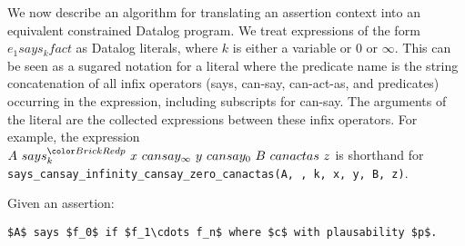 \documentclass[thesis.tex]{subfiles}
\begin{document}
We now describe an algorithm for translating an assertion context into
an equivalent constrained Datalog program. We treat expressions of the
form $e_1 says_k fact$ as Datalog literals, where $k$ is either a
variable or 0 or $\infty$. This can be seen as a sugared notation for
a literal where the predicate name is the string concatenation of all
infix operators (\textsf{says}, \textsf{can-say}, \textsf{can-act-as},
and predicates) occurring in the expression, including subscripts for
\textsf{can-say}. The arguments of the literal are the collected
expressions between these infix operators. For example, the expression
$A~says_k^{\new{p}}~x~can say_\infty~y~can say_0~B~can act as~z$ is
shorthand for
\texttt{says\_cansay\_infinity\_cansay\_zero\_canactas(A, , k,
x, y, B, z)}.

Given an assertion: 

\begin{center} \lstinline!$A$ says $f_0$ if $f_1\cdots f_n$ where $c$ with plausability $p$.! \end{center}
\end{document}
